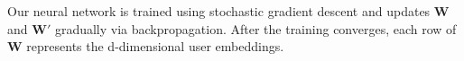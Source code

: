 \documentclass[sigconf]{acmart}
\begin{document}


Our neural network is trained using stochastic gradient descent and updates $\textbf{W}$ and $\textbf{W}'$ gradually via backpropagation. After the training converges, each row of $\textbf{W}$ represents the d-dimensional user embeddings. %
\end{document}
